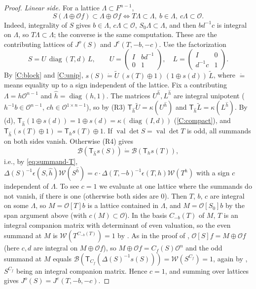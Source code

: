\documentclass[11pt,oneside,notitlepage]{book}
\numberwithin{equation}{section}
\theoremstyle{plain}
\theoremstyle{definition}
\newcommand{\cO}{\mathcal{O}}
\newcommand{\cW}{\mathcal{W}}
\newcommand{\cB}{\mathcal{B}}
\newcommand{\val}{\operatorname{val}}
\newcommand{\diag}{\operatorname{diag}}
\newcommand{\T}{\mathsf{T}}
\renewcommand{\doteqdot}{\mathrel{\dot=}}
\begin{document}
\begin{proof}
\emph{Linear side.} For a lattice $\Lambda\subset F^{n-1}$,
\[S(\Lambda\oplus\cO f)\subset\Lambda\oplus\cO f\iff T\Lambda\subset\Lambda,\ b\in\Lambda,\ c\Lambda\subset\cO.\]
Indeed, integrality of $S$ gives $b\in\Lambda$, $c\Lambda\subset\cO$, $S_0\Lambda\subset\Lambda$, and then $bd^{-1}c$ is integral on $\Lambda$, so $T\Lambda\subset\Lambda$; the converse is the same computation. These are the contributing lattices of $J^o(S)$ and $J^e(T,-b,-c)$. Use the factorization
\[S=U\,\diag(T,d)\,L,\qquad U=\begin{pmatrix}I&bd^{-1}\\0&1\end{pmatrix},\quad L=\begin{pmatrix}I&0\\d^{-1}c&1\end{pmatrix}.\]
By \ref{C:block} and \ref{C:unip}, $s(S)\doteqdot\tilde U\,(s(T)\oplus1)\,(1\oplus s(d))\,\tilde L$, where $\doteqdot$ means equality up to a sign independent of the lattice. Fix a contributing $\Lambda=h\cO^{n-1}$ and $\hat h=\diag(h,1)$. The matrices $U^{\hat h},L^{\hat h}$ are integral unipotent ($h^{-1}b\in\cO^{n-1}$, $ch\in\cO^{1\times n-1}$), so by (R3) $\T_{\hat h}\tilde U=\kappa(U^{\hat h})$ and $\T_{\hat h}\tilde L=\kappa(L^{\hat h})$. By (d), $\T_{\hat h}(1\oplus s(d))=1\oplus s(d)=\kappa(\diag(I,d))$ (\ref{C:compact}), and $\T_{\hat h}(s(T)\oplus1)=\T_hs(T)\oplus1$. If $\val\det S=\val\det T$ is odd, all summands on both sides vanish. Otherwise (R4) gives
\[\cB(\T_{\hat h}s(S))\doteqdot\cB(\T_hs(T)),\]
i.e., by \eqref{eq:summand-T}, $\Delta(S)^{-1}\epsilon(S,\hat h)\cW(S^{\hat h})=c\cdot\Delta(T,-b)^{-1}\epsilon(T,h)\cW(T^h)$ with a sign $c$ independent of $\Lambda$. To see $c=1$ we evaluate at one lattice where the summands do not vanish, if there is one (otherwise both sides are $0$). Then $T$, $b$, $c$ are integral on some $\Lambda$, so $M=\cO[T]b$ is a lattice contained in $\Lambda$, and $M=\cO[S_0]b$ by the span argument above (with $c(M)\subset\cO$). In the basis $C_{-b}(T)$ of $M$, $T$ is an integral companion matrix with determinant of even valuation, so the even summand at $M$ is $\cW(T^{C_{-b}(T)})=1$ by . As in the proof of , $\cO[S]f=M\oplus\cO f$ (here $c,d$ are integral on $M\oplus\cO f$), so $M\oplus\cO f=C_f(S)\cO^n$ and the odd summand at $M$ equals $\cB(\T_{C_f}(\Delta(S)^{-1}s(S)))=\cW(S^{C_f})=1$, again by , $S^{C_f}$ being an integral companion matrix. Hence $c=1$, and summing over lattices gives $J^o(S)=J^e(T,-b,-c)$.


\end{proof}
\end{document}
